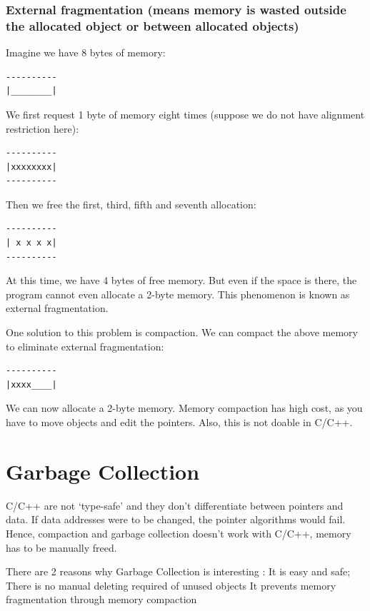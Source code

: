 \documentclass[twoside]{article}
\begin{document}
\subsubsection{External fragmentation (means memory is wasted outside the allocated object or between allocated objects)}

Imagine we have 8 bytes of memory:

\begin{lstlisting}
----------
|________|
\end{lstlisting}

We first request 1 byte of memory eight times (suppose we do not have alignment restriction here):

\begin{lstlisting}
----------
|xxxxxxxx|
----------
\end{lstlisting}

Then we free the first, third, fifth and seventh allocation:

\begin{lstlisting}
----------
| x x x x|
----------
\end{lstlisting}

At this time, we have 4 bytes of free memory. But even if the space is there, the program cannot even allocate a 2-byte memory. This phenomenon is known as external fragmentation. 

One solution to this problem is compaction. We can compact the above memory to eliminate external fragmentation:

\begin{lstlisting}
----------
|xxxx____|
\end{lstlisting}

We can now allocate a 2-byte memory. Memory compaction has high cost, as you have to move objects and edit the pointers. Also, this is not doable in C/C++.

\section{Garbage Collection}
C/C++ are not ‘type-safe’ and they don’t differentiate between pointers and data. If data addresses were to be changed, the pointer algorithms would fail. Hence, compaction and garbage collection doesn’t work with C/C++, memory has to be manually freed.

There are 2 reasons why Garbage Collection is interesting :
It is easy and safe; There is no manual deleting required of unused objects
It prevents memory fragmentation through memory compaction
\end{document}
